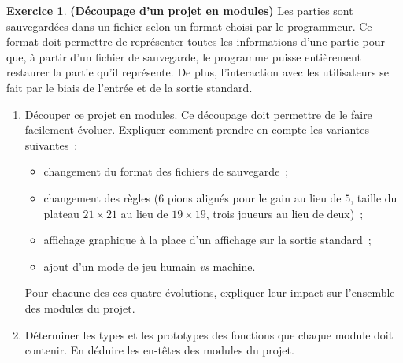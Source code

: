 \documentclass[12pt]{article}
\theoremstyle{definition}
\newtheorem{Exercice}{Exercice}
\begin{document}
\begin{Exercice} {\bf (Découpage d'un projet en modules)}
Les parties sont sauvegardées dans un fichier selon un format choisi par
le programmeur. Ce format doit permettre de représenter toutes les
informations d'une partie pour que, à partir d'un fichier de sauvegarde,
le programme puisse entièrement restaurer la partie qu'il représente. De
plus, l'interaction avec les utilisateurs se fait par le biais de l'entrée
et de la sortie standard.
\medskip

\begin{enumerate}
    \item Découper ce projet en modules. Ce découpage doit permettre
    de le faire facilement évoluer. Expliquer comment prendre en compte
    les variantes suivantes~:
    \begin{itemize}
        \item changement du format des fichiers de sauvegarde~;
        \smallskip

        \item changement des règles ($6$ pions alignés pour le gain au
        lieu de $5$, taille du plateau $21 \times 21$ au lieu
        de $19 \times 19$, trois joueurs au lieu de deux)~;
        \smallskip

        \item affichage graphique à la place d'un affichage sur la sortie
        standard~;
        \smallskip

        \item ajout d'un mode de jeu humain {\em vs} machine.
    \end{itemize}
    Pour chacune des ces quatre évolutions, expliquer leur impact sur
    l'ensemble des modules du projet.
    \smallskip

    \item Déterminer les types et les prototypes des fonctions que chaque
    module doit contenir. En déduire les en-têtes des modules du projet.
\end{enumerate}
\end{Exercice}
\bigskip
\end{document}
